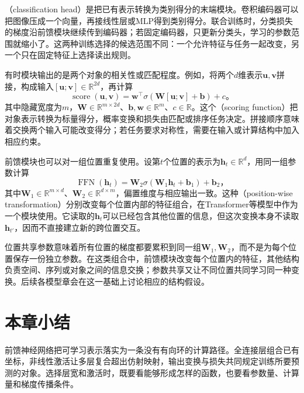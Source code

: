 （classification head）是把已有表示转换为类别得分的末端模块。卷积编码器可以把图像压成一个向量，再接线性层或MLP得到类别得分。联合训练时，分类损失的梯度沿前馈模块继续传到编码器；若固定编码器，只更新分类头，学习的参数范围就缩小了。这两种训练选择的候选范围不同：一个允许特征与任务一起改变，另一个只在固定特征上选择读出规则。

有时模块输出的是两个对象的相关性或匹配程度。例如，将两个$d$维表示$\bm{u},\bm{v}$拼接，构成输入$[\bm{u};\bm{v}]\in\mathbb{R}^{2d}$，再计算
\begin{equation}
  \operatorname{score}(\bm{u},\bm{v})=
  \bm{w}^{\top}\sigma\!\left(\bm{W}[\bm{u};\bm{v}]+\bm{b}\right)+c\text{。}
  \label{eq:ffn-scoring-module}
\end{equation}
其中隐藏宽度为$m$，$\bm{W}\in\mathbb{R}^{m\times2d}$、$\bm{b},\bm{w}\in\mathbb{R}^{m}$、$c\in\mathbb{R}$。这个（scoring function）把对象表示转换为标量得分，概率变换和损失由匹配或排序任务决定。拼接顺序意味着交换两个输入可能改变得分；若任务要求对称性，需要在输入或计算结构中加入相应约束。

前馈模块也可以对一组位置重复使用。设第$t$个位置的表示为$\bm{h}_t\in\mathbb{R}^{d}$，用同一组参数计算
\begin{equation}
  \operatorname{FFN}(\bm{h}_t)=
  \bm{W}_2\sigma(\bm{W}_1\bm{h}_t+\bm{b}_1)+\bm{b}_2\text{，}
  \label{eq:ffn-positionwise-module}
\end{equation}
其中$\bm{W}_1\in\mathbb{R}^{m\times d}$、$\bm{W}_2\in\mathbb{R}^{d\times m}$，偏置维度与相应输出一致。这种（position-wise transformation）分别改变每个位置内部的特征组合，在Transformer等模型中作为一个模块使用。它读取的$\bm{h}_t$可以已经包含其他位置的信息，但这次变换本身不读取$\bm{h}_{t'}$，因而不直接建立新的跨位置交互。

位置共享参数意味着所有位置的梯度都要累积到同一组$\bm{W}_1,\bm{W}_2$，而不是为每个位置保存一份独立参数。在这类组合中，前馈模块改变每个位置内的特征，其他结构负责空间、序列或对象之间的信息交换；参数共享又让不同位置共同学习同一种变换。后续各模型章会在这一基础上讨论相应的结构假设。

\section{本章小结}
\label{sec:ffn-summary}

前馈神经网络把可学习表示落实为一条没有有向环的计算路径。全连接层组合已有坐标，非线性激活让多层复合超出仿射映射，输出变换与损失共同规定训练所要预测的对象。选择层宽和激活时，既要看能够形成怎样的函数，也要看参数量、计算量和梯度传播条件。

